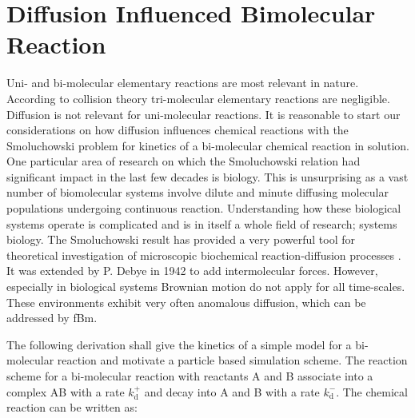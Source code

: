 \documentclass[
  a4paper,BCOR10mm,oneside,
  headsepline,footsepline,%
  fleqn,openbib
]{scrbook}
\begin{document}
% 
% 
% 
% 

\section{Diffusion Influenced Bimolecular Reaction}\label{Erban-chapman-section}
Uni- and bi-molecular elementary reactions are most relevant in nature. According to collision theory tri-molecular elementary reactions are negligible. Diffusion is not relevant for uni-molecular reactions. It is reasonable to start our considerations on how diffusion influences chemical reactions with the Smoluchowski problem for kinetics of a bi-molecular chemical reaction in solution. One particular area of research on which the Smoluchowski relation had significant impact in the last few decades is biology. This is unsurprising as a vast number of biomolecular systems involve dilute and minute diffusing molecular populations undergoing continuous reaction. Understanding how these biological systems operate is complicated and is in itself a whole field of research; systems biology. The Smoluchowski result has provided a very powerful tool for theoretical investigation of microscopic biochemical reaction-diffusion processes \cite{Flegg}. It was extended by P. Debye in 1942 to add intermolecular forces. However, especially in biological systems Brownian motion do not apply for all time-scales. These environments exhibit very often anomalous diffusion, which can be addressed by fBm. 
\par
The following derivation shall give the kinetics of a simple model for a bi-molecular reaction and motivate a particle based simulation scheme.
The reaction scheme for a bi-molecular reaction with reactants A and B associate into a complex AB with a rate $k^{+}_{\mathrm{d}}$ and decay into A and B with a rate $k^{-}_{\mathrm{d}}$. The chemical reaction can be written as:
\end{document}
